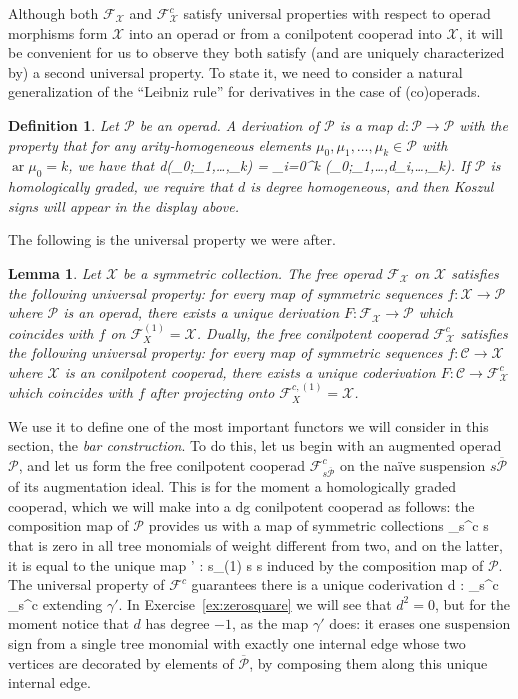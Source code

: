 \documentclass[fleqn, a4paper, twoside]{article}
\makeatletter
\newcommand{\0}{\langle 0\rangle}
\newcommand{\XX}{\mathcal{X}}
\newcommand{\FF}{\mathcal{F}}
\newcommand{\ari}{\operatorname{ar}}
\let\[\@undefined
\DeclareRobustCommand{\[}{\begin{equation}}%
\let\]\@undefined
\DeclareRobustCommand{\]}{\end{equation}}%
\theoremstyle{mytheorem}
\newtheorem{lemma}[theorem]{Lemma}
\theoremstyle{introthm}
\theoremstyle{mydefinition}
\newtheorem{definition}[theorem]{Definition}
\theoremstyle{mydefinition2}
\theoremstyle{plain} %
\newcommand{\CC}{\mathcal{C}}
\newcommand{\?}{\,?\,}
\newcommand{\PP}{{\mathcal{P}}}
\theoremstyle{mytheorem}
\theoremstyle{plain} %
\makeatother
\begin{document}
Although both $\FF_\XX$ and $\FF_\XX^c$ satisfy universal properties
with respect to operad morphisms form $\XX$ into an operad or from
a conilpotent cooperad into $\XX$, it will be convenient for us to 
observe they both satisfy (and are uniquely characterized by) a
second universal property. To state it, we need to consider a natural
generalization of the ``Leibniz rule'' for derivatives in the case
of (co)operads.

\begin{definition}
Let $\PP$ be an operad. A derivation of $\PP$ is a map
$d : \PP\longrightarrow \PP$ with the property that
for any arity-homogeneous elements $\mu_0,\mu_1,\ldots,\mu_k\in\PP$
with $\ari{\mu_0} = k$, we have that 
\[
d\gamma(\mu_0;\mu_1,\ldots,\mu_k) = 
	\sum_{i=0}^k \gamma(\mu_0;\mu_1,\ldots,d\mu_i,\ldots,\mu_k).
	\]
If $\PP$ is homologically graded, we require that $d$ is degree homogeneous,
and then Koszul signs will appear in the display
above.
\end{definition}

The following is the universal property we were after.

\begin{lemma}
Let $\XX$ be a symmetric collection. The free operad $\FF_\XX$
on $\XX$ satisfies the following universal property: for every
map of symmetric sequences $f: \XX\longrightarrow \PP$ where $\PP$
is an operad, there exists a unique derivation $F: \FF_\XX
\longrightarrow \PP$ which coincides with $f$ on $\FF_X^{(1)}=\XX$.
Dually, the free conilpotent cooperad $\FF_\XX^c$ satisfies the following
universal property: for every
map of symmetric sequences $f: \CC\longrightarrow \XX$ where $\XX$
is an conilpotent cooperad, there exists a unique coderivation $F: \CC
\longrightarrow \FF_\XX^c$ which coincides with $f$ after
projecting onto $\FF_X^{c,(1)}=\XX$.
\end{lemma}

We use it to define one of the most important functors we will 
consider in this section, the \emph{bar construction}. To do this,
let us begin with an augmented operad $\PP$, and let us form
the free conilpotent cooperad $\FF_{s\overline{\PP}}^c$ on the
na\"ive suspension $s\overline{\PP}$ of its augmentation ideal.
This is for the moment a homologically graded cooperad, which we will
make into a dg conilpotent cooperad as follows: the composition
map of $\PP$ provides us with a map of symmetric collections
\[
\FF_{s\overline{\PP}}^c \longrightarrow s\overline\PP
\]
that is zero in all tree monomials of weight different from two, and
on the latter, it is equal to the unique map
\[
\gamma' : s\overline\PP \circ_{(1)} s\overline{\PP} 
 \longrightarrow s\overline{\PP}
\]
induced by the composition map of $\PP$. The universal property of $\FF^c$
guarantees there is a unique coderivation 
\[ d : \FF_{s\overline{\PP}}^c \longrightarrow \FF_{s\overline{\PP}}^c\]
extending $\gamma'$. In Exercise~\ref{ex:zerosquare} we will see that
$d^2 = 0$, but for the moment notice that $d$ has degree $-1$,
as the map $\gamma'$ does: it erases one suspension sign from 
a single tree monomial with exactly one internal edge whose
two vertices are decorated by elements of $\overline{\PP}$,
by composing them along this unique internal edge.
\end{document}
